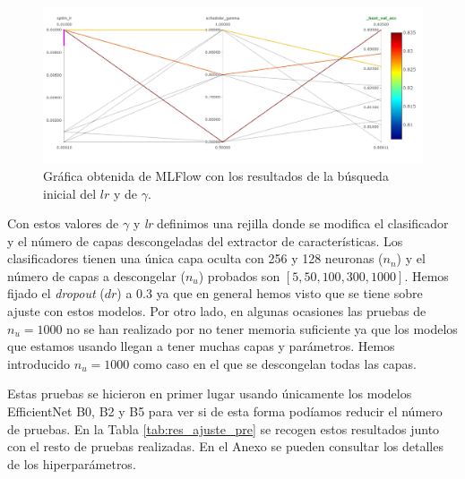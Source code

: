 \documentclass[a4paper,12pt,twoside,titlepage]{article}
\begin{document}
\begin{figure}[h!]
  \centering
  \includegraphics[scale=0.65, center]{studio_optim_pre.png}
  \caption{Gráfica obtenida de MLFlow con los resultados de la búsqueda inicial del $lr$ y de $\gamma$.}
  \label{fig:studio_optim}
\end{figure}


Con estos valores de $\gamma$ y \textit{lr} definimos una rejilla donde se modifica el clasificador y el número de capas descongeladas del extractor de características. Los clasificadores tienen una única capa oculta con 256 y 128 neuronas ($n_n$) y el número de capas a descongelar ($n_u$) probados son $\left[5, 50, 100, 300, 1000 \right]$. Hemos fijado el \textit{dropout} ($dr$) a 0.3 ya que en general hemos visto que se tiene sobre ajuste con estos modelos. Por otro lado, en algunas ocasiones las pruebas de $n_u = 1000$ no se han realizado por no tener memoria suficiente ya que los modelos que estamos usando llegan a tener muchas capas y parámetros. Hemos introducido $n_u=1000$ como caso en el que se descongelan todas las capas.  

Estas pruebas se hicieron en primer lugar usando únicamente los modelos EfficientNet B0, B2 y B5 para ver si de esta forma podíamos reducir el número de pruebas. En la Tabla \ref{tab:res_ajuste_pre} se recogen estos resultados junto con el resto de pruebas realizadas. En el Anexo se pueden consultar los detalles de los hiperparámetros.
\end{document}
